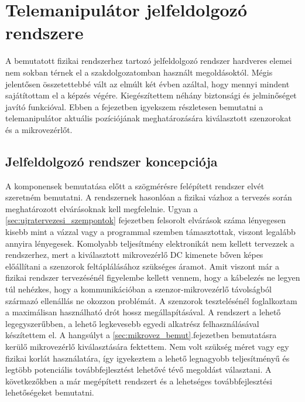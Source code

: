 \chapter{Telemanipulátor jelfeldolgozó rendszere}
\label{sec:LatexTools}

A bemutatott fizikai rendszerhez tartozó jelfeldolgozó rendszer hardveres elemei nem sokban térnek el a szakdolgozatomban használt megoldásoktól. Mégis jelentősen összetettebbé vált az elmúlt két évben azáltal, hogy mennyi mindent sajátítottam el a képzés végére. Kiegészítettem néhány biztonsági és jelminőséget javító funkcióval. Ebben a fejezetben igyekszem részletesen bemutatni a telemanipulátor aktuális pozíciójának meghatározására kiválasztott szenzorokat és a mikrovezérlőt.

\section{Jelfeldolgozó rendszer koncepciója}

A komponensek bemutatása előtt a szögmérésre felépített rendszer elvét szeretném bemutatni. A rendszernek hasonlóan a fizikai vázhoz a tervezés során meghatározott elvárásoknak kell megfelelnie. Ugyan a \ref{sec:ujratervezesi_szempontok} fejezetben felsorolt elvárások száma lényegesen kisebb mint a vázzal vagy a programmal szemben támasztottak, viszont legalább annyira lényegesek. Komolyabb teljesítmény elektronikát nem kellett tervezzek a rendszerhez, mert a kiválasztott mikrovezérlő DC kimenete bőven képes előállítani a szenzorok feltáplálásához szükséges áramot. Amit viszont már a fizikai rendszer tervezésénél figyelembe kellett vennem, hogy a kábelezés ne legyen túl nehézkes, hogy a kommunikációban a szenzor-mikrovezérlő távolságból származó ellenállás ne okozzon problémát. A szenzorok tesztelésénél foglalkoztam a maximálisan használható drót hossz megállapításával. A rendszert a lehető legegyszerűbben, a lehető legkevesebb egyedi alkatrész felhasználásával készítettem el. A hangsúlyt a \ref{sec:mikrovez_bemut}.fejezetben bemutatásra kerülő mikrovezérlő kiválasztására fektettem. Nem volt szükség méret vagy egy fizikai korlát használatára, így igyekeztem a lehető legnagyobb teljesítményű és legtöbb potenciális továbbfejlesztést lehetővé tévő megoldást választani. A következőkben a már megépített rendszert és a lehetséges továbbfejlesztési lehetőségeket bemutatni.

